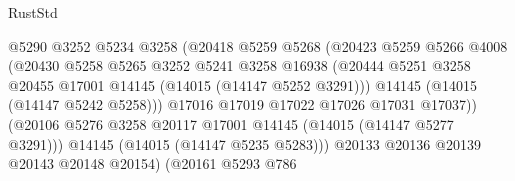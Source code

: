 \begin{lexlean}{RustStd}
\begin{coremodule}
                                        @5290
                                        @3252
                                        @5234
                                        @3258
                                        (@20418
                                          @5259
                                          @5268
                                          (@20423
                                            @5259
                                            @5266
                                            @4008
                                            (@20430
                                              @5258
                                              @5265
                                              @3252
                                              @5241
                                              @3258
                                              @16938
                                              (@20444
                                                @5251
                                                @3258
                                                @20455
                                                @17001
                                                @14145
                                                (@14015 (@14147 @5252 @3291)))
                                              @14145
                                              (@14015 (@14147 @5242 @5258)))
                                            @17016
                                            @17019
                                            @17022
                                            @17026
                                            @17031
                                            @17037))
                                        (@20106
                                          @5276
                                          @3258
                                          @20117
                                          @17001
                                          @14145
                                          (@14015 (@14147 @5277 @3291)))
                                        @14145
                                        (@14015 (@14147 @5235 @5283)))
                                      @20133
                                      @20136
                                      @20139
                                      @20143
                                      @20148
                                      @20154)
                                    (@20161
                                      @5293
                                      @786

\end{coremodule}
\end{lexlean}
